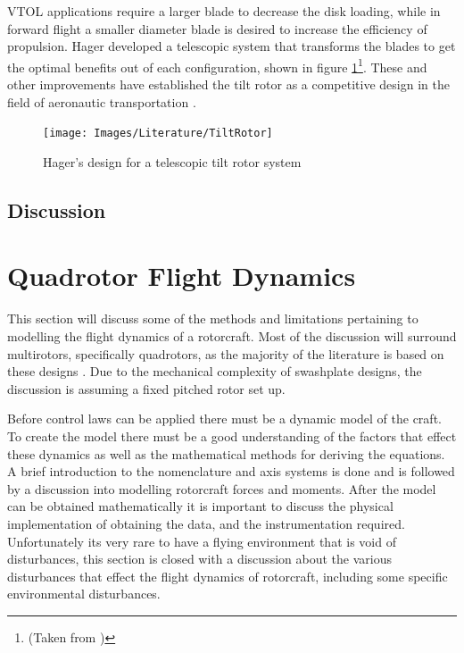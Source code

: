 VTOL applications require a larger blade to decrease the disk loading, while in forward flight a smaller diameter blade is desired to increase the efficiency of propulsion. Hager \cite{US6030177} developed a telescopic system that transforms the blades to get the optimal benefits out of each configuration, shown in figure \ref{IM_TiltRotor}\footnote{(Taken from \cite{Heli})}. These and other improvements have established the tilt rotor as a competitive design in the field of aeronautic transportation \cite{RotorConfig}.

\begin{figure}[H]
	\centering
	\texttt{[image: Images/Literature/TiltRotor]}     
	\caption{Hager's design for a telescopic tilt rotor system \cite{Heli}}
	\label{IM_TiltRotor}
\end{figure}

\subsection{Discussion}


\section{Quadrotor Flight Dynamics}\label{SECT_QuadFlightDynamics}

This section will discuss some of the methods and limitations pertaining to modelling the flight dynamics of a rotorcraft. Most of the discussion will surround multirotors, specifically quadrotors, as the majority of the literature is based on these designs \cite{Luukkonen, RealTime, Pounds2006, Hoffmann, Moller2015}. Due to the mechanical complexity of swashplate designs, the discussion is assuming a fixed pitched rotor set up. 

Before control laws can be applied there must be a dynamic model of the craft. To create the model there must be a good understanding of the factors that effect these dynamics as well as the mathematical methods for deriving the equations. A brief introduction to the nomenclature and axis systems is done and is followed by a discussion into modelling rotorcraft forces and moments. After the model can be obtained mathematically it is important to discuss the physical implementation of obtaining the data, and the instrumentation required. Unfortunately its very rare to have a flying environment that is void of disturbances, this section is closed with a discussion about the various disturbances that effect the flight dynamics of rotorcraft, including some specific environmental disturbances.

